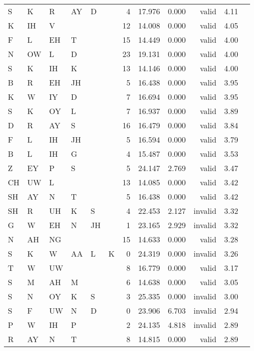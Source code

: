 \begin{longtable}{l@{ } l@{ } l@{ } l@{ } l@{ } l r r r r r r}
S  & K  & R  & AY & D  &   &  4 & 17.976 & 0.000 & valid   & 4.11 \\
K  & IH & V  &    &    &   & 12 & 14.008 & 0.000 & valid   & 4.05 \\
F  & L  & EH & T  &    &   & 15 & 14.449 & 0.000 & valid   & 4.00 \\
N  & OW & L  & D  &    &   & 23 & 19.131 & 0.000 & valid   & 4.00 \\
S  & K  & IH & K  &    &   & 13 & 14.146 & 0.000 & valid   & 4.00 \\
B  & R  & EH & JH &    &   &  5 & 16.438 & 0.000 & valid   & 3.95 \\
K  & W  & IY & D  &    &   &  7 & 16.694 & 0.000 & valid   & 3.95 \\
S  & K  & OY & L  &    &   &  7 & 16.937 & 0.000 & valid   & 3.89 \\
D  & R  & AY & S  &    &   & 16 & 16.479 & 0.000 & valid   & 3.84 \\
F  & L  & IH & JH &    &   &  5 & 16.594 & 0.000 & valid   & 3.79 \\
B  & L  & IH & G  &    &   &  4 & 15.487 & 0.000 & valid   & 3.53 \\
Z  & EY & P  & S  &    &   &  5 & 24.147 & 2.769 & valid   & 3.47 \\
CH & UW & L  &    &    &   & 13 & 14.085 & 0.000 & valid   & 3.42 \\
SH & AY & N  & T  &    &   &  5 & 16.438 & 0.000 & valid   & 3.42 \\
SH & R  & UH & K  & S  &   &  4 & 22.453 & 2.127 & invalid & 3.32 \\
G  & W  & EH & N  & JH &   &  1 & 23.165 & 2.929 & invalid & 3.32 \\
N  & AH & NG &    &    &   & 15 & 14.633 & 0.000 & valid   & 3.28 \\
S  & K  & W  & AA & L  & K &  0 & 24.319 & 0.000 & invalid & 3.26 \\
T  & W  & UW &    &    &   &  8 & 16.779 & 0.000 & valid   & 3.17 \\
S  & M  & AH & M  &    &   &  6 & 14.638 & 0.000 & valid   & 3.05 \\
S  & N  & OY & K  & S  &   &  3 & 25.335 & 0.000 & invalid & 3.00 \\
S  & F  & UW & N  & D  &   &  0 & 23.906 & 6.703 & invalid & 2.94 \\
P  & W  & IH & P  &    &   &  2 & 24.135 & 4.818 & invalid & 2.89 \\
R  & AY & N  & T  &    &   &  8 & 14.815 & 0.000 & valid   & 2.89 \\

\end{longtable}
